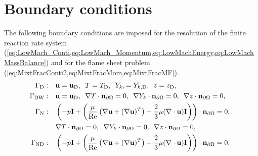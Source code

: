 \section{Boundary conditions}
The following boundary conditions are imposed for the resolution of the finite reaction rate system (\cref{eq:LowMach_Conti,eq:LowMach_Momentum,eq:LowMachEnergy,eq:LowMachMassBalance}) and for the flame sheet problem (\cref{eq:MixtFracConti2,eq:MixtFracMom,eq:MixtFracMF}).
\begin{subequations}
	\begin{align}
		\Gamma_{\text{D}}:\quad
		 & \vec{u} = \vec{u}_{\text{D}},
		\,\,\,
		T = T_{\text{D}},
		\,\,\,
		Y_{k}, =Y_{k,{\text{D}}},
		\,\,\,
		z = z_{\text{D}},
		\label{eq:bc_d}                                                                                                                                                                                             \\
		\Gamma_{{\text{DW}}}:\quad
		 & \vec{u} = \vec{u}_{\text{D}},
		\,\,\,
		\nabla T \cdot \vec{n}_{\partial \Omega} = 0,
		\,\,\,
		\nabla Y_{k} \cdot  \vec{n}_{\partial \Omega}= 0,
		\,\,\,
		\nabla z \cdot \vec{n}_{\partial \Omega} = 0,
		\label{eq:bc_dn}                                                                                                                                                                                            \\
		\Gamma_{\text{N}}: \quad
		 & \left( -p \mathbf{I}	+ \left(\frac{\mu}{\Reynolds} \left(\nabla \vec{u} + (\nabla \vec{u})^T\right) - \frac{2}{3}\mu(\nabla \cdot \vec{u})\mathbf{I}\right)\right)\cdot  \vec{n}_{\partial \Omega} 	= 0,
		\,\,\,\notag                                                                                                                                                                                                \\
		 &
		\nabla T \cdot \vec{n}_{\partial \Omega} = 0,
		\,\,\,
		\nabla  Y_{k} \cdot \vec{n}_{\partial \Omega}= 0,
		\,\,\,
		\nabla z \cdot \vec{n}_{\partial \Omega} = 0,
		\label{eq:bc_O}                                                                                                                                                                                             \\
		\Gamma_{\text{ND}}:\quad
		 & \left( -p \mathbf{I}	+ \left(\frac{\mu}{\Reynolds} \left(\nabla \vec{u} + (\nabla \vec{u})^T\right) - \frac{2}{3}\mu(\nabla \cdot \vec{u})\mathbf{I}\right)\right)\cdot  \vec{n}_{\partial \Omega} 	= 0,

\end{align}
\end{subequations}
